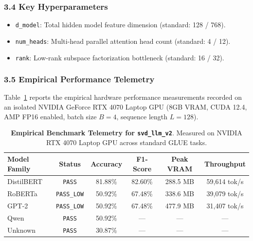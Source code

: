 \subsubsection*{3.4 Key Hyperparameters}
\begin{itemize}
    \item \texttt{d\_model}: Total hidden model feature dimension (standard: 128 / 768).
    \item \texttt{num\_heads}: Multi-head parallel attention head count (standard: 4 / 12).
    \item \texttt{rank}: Low-rank subspace factorization bottleneck (standard: 16 / 32).
\end{itemize}

\subsubsection*{3.5 Empirical Performance Telemetry}
Table~\ref{tab:telemetry_svd_llm_v2} reports the empirical hardware performance measurements recorded on an isolated NVIDIA GeForce RTX 4070 Laptop GPU (8GB VRAM, CUDA 12.4, AMP FP16 enabled, batch size $B=4$, sequence length $L=128$).

\begin{table}[h]
\centering
\small
\caption{\textbf{Empirical Benchmark Telemetry for \texttt{svd\_llm\_v2}}. Measured on NVIDIA RTX 4070 Laptop GPU across standard GLUE tasks.}
\label{tab:telemetry_svd_llm_v2}
\begin{tabular*}{\columnwidth}{@{\extracolsep{\fill}}lccccc}
\toprule
\textbf{Model Family} & \textbf{Status} & \textbf{Accuracy} & \textbf{F1-Score} & \textbf{Peak VRAM} & \textbf{Throughput} \\
\midrule
DistilBERT & \texttt{PASS} & 81.88\% & 82.60\% & 288.5 MB & 59,614 tok/s \\
RoBERTa & \texttt{PASS\_LOW} & 50.92\% & 67.48\% & 338.6 MB & 39,079 tok/s \\
GPT-2 & \texttt{PASS\_LOW} & 50.92\% & 67.48\% & 477.9 MB & 31,407 tok/s \\
Qwen & \texttt{PASS} & 50.92\% & --- & --- & --- \\
Unknown & \texttt{PASS} & 30.87\% & --- & --- & --- \\
\bottomrule
\end{tabular*}
\end{table}

